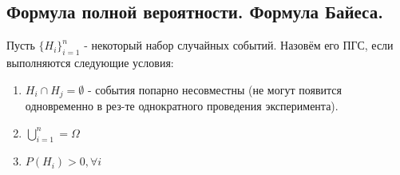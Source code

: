 \subsection{Формула полной вероятности. Формула Байеса.}

\begin{definition}
	Пусть $ \{ H_i \}_{i=1}^n $ - некоторый набор случайных событий. Назовём его ПГС, если выполняются следующие условия:
	\begin{enumerate}
		\item $H_i \cap H_j = \emptyset$ - события попарно несовместны (не могут появится одновременно в рез-те однократного проведения эксперимента).
		\item $\bigcup\limits_{i=1}^{n} = \Omega$
		\item $P(H_i) > 0, \forall i$
	\end{enumerate}
\end{definition}

